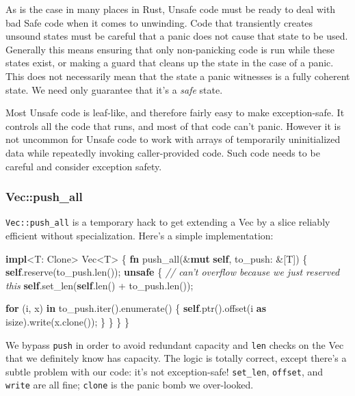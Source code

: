 \documentclass[a4paper,]{book}
\newenvironment{Shaded}{\begin{snugshade}}{\end{snugshade}}
\newcommand{\KeywordTok}[1]{\textcolor[rgb]{0.13,0.29,0.53}{\textbf{{#1}}}}
\newcommand{\DataTypeTok}[1]{\textcolor[rgb]{0.13,0.29,0.53}{{#1}}}
\newcommand{\CommentTok}[1]{\textcolor[rgb]{0.56,0.35,0.01}{\textit{{#1}}}}
\newcommand{\BuiltInTok}[1]{{#1}}
\newcommand{\NormalTok}[1]{{#1}}
\begin{document}
As is the case in many places in Rust, Unsafe code must be ready to deal
with bad Safe code when it comes to unwinding. Code that transiently
creates unsound states must be careful that a panic does not cause that
state to be used. Generally this means ensuring that only non-panicking
code is run while these states exist, or making a guard that cleans up
the state in the case of a panic. This does not necessarily mean that
the state a panic witnesses is a fully coherent state. We need only
guarantee that it's a \emph{safe} state.

Most Unsafe code is leaf-like, and therefore fairly easy to make
exception-safe. It controls all the code that runs, and most of that
code can't panic. However it is not uncommon for Unsafe code to work
with arrays of temporarily uninitialized data while repeatedly invoking
caller-provided code. Such code needs to be careful and consider
exception safety.

\subsubsection{Vec::push\_all}\label{vecpushux5fall}

\texttt{Vec::push\_all} is a temporary hack to get extending a Vec by a
slice reliably efficient without specialization. Here's a simple
implementation:

\begin{Shaded}
\begin{Highlighting}[]
\KeywordTok{impl}\NormalTok{<T: }\BuiltInTok{Clone}\NormalTok{> }\DataTypeTok{Vec}\NormalTok{<T> \{}
    \KeywordTok{fn} \NormalTok{push_all(&}\KeywordTok{mut} \KeywordTok{self}\NormalTok{, to_push: &[T]) \{}
        \KeywordTok{self}\NormalTok{.reserve(to_push.len());}
        \KeywordTok{unsafe} \NormalTok{\{}
            \CommentTok{// can't overflow because we just reserved this}
            \KeywordTok{self}\NormalTok{.set_len(}\KeywordTok{self}\NormalTok{.len() + to_push.len());}

            \KeywordTok{for} \NormalTok{(i, x) }\KeywordTok{in} \NormalTok{to_push.iter().enumerate() \{}
                \KeywordTok{self}\NormalTok{.ptr().offset(i }\KeywordTok{as} \DataTypeTok{isize}\NormalTok{).write(x.clone());}
            \NormalTok{\}}
        \NormalTok{\}}
    \NormalTok{\}}
\NormalTok{\}}
\end{Highlighting}
\end{Shaded}

We bypass \texttt{push} in order to avoid redundant capacity and
\texttt{len} checks on the Vec that we definitely know has capacity. The
logic is totally correct, except there's a subtle problem with our code:
it's not exception-safe! \texttt{set\_len}, \texttt{offset}, and
\texttt{write} are all fine; \texttt{clone} is the panic bomb we
over-looked.
\end{document}
